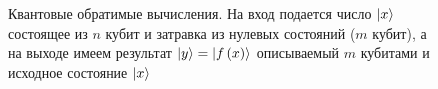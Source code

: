 \begin{figure}
\centering



\caption{Квантовые обратимые вычисления. На вход подается число
  $\ket{x}$ состоящее из $n$ кубит и затравка из нулевых
  состояний ($m$ кубит), а на выходе имеем результат $\ket{y} =
  \left|f\left(x\right)\right>$ описываемый $m$ кубитами и исходное
  состояние $\ket{x}$} 
\label{figQuantCompQuantComp}
\end{figure}
